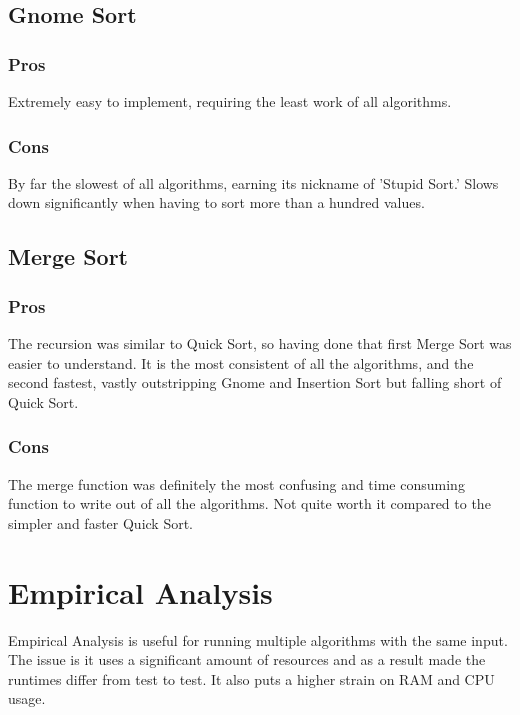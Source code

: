 \documentclass[conference]{IEEEtran}
\begin{document}
\subsection{Gnome Sort}
\subsubsection{Pros}
Extremely easy to implement, requiring the least work of all algorithms.
\subsubsection{Cons}
By far the slowest of all algorithms, earning its nickname of 'Stupid Sort.' Slows down significantly when having to sort more than a hundred values.

\subsection{Merge Sort}
\subsubsection{Pros}
The recursion was similar to Quick Sort, so having done that first Merge Sort was easier to understand. It is the most consistent of all the algorithms, and the second fastest, vastly outstripping Gnome and Insertion Sort but falling short of Quick Sort.
\subsubsection{Cons}
The merge function was definitely the most confusing and time consuming function to write out of all the algorithms. Not quite worth it compared to the simpler and faster Quick Sort.


\section{Empirical Analysis}
Empirical Analysis is useful for running multiple algorithms with the same input. The issue is it uses a significant amount of resources and as a result made the runtimes differ from test to test. It also puts a higher strain on RAM and CPU usage.
\end{document}
